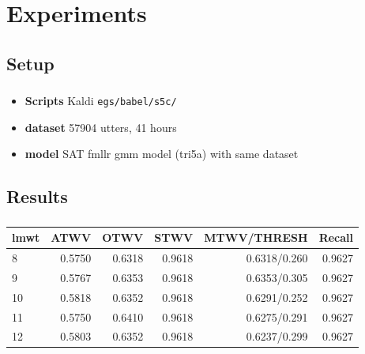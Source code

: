 \documentclass{beamer}
\begin{document}
\section{Experiments}
\subsection{Setup}
\frame
{
  \frametitle{\subsecname}
  
  \begin{itemize}
    \item \textbf{Scripts} Kaldi \texttt{egs/babel/s5c/}
    \item \textbf{dataset} 57904 utters, 41 hours
    \item \textbf{model} SAT fmllr gmm model (tri5a) with same dataset
  \end{itemize}
}

\subsection{Results}
\frame
{
  \frametitle{\subsecname}
  
        \begin{tabular}{l|r|r|r|r|r}
           lmwt              &   ATWV    &    OTWV   &  STWV   &  MTWV/THRESH  &  Recall \\
           \hline
           \hline
           8                     &    0.5750   &    0.6318   &   0.9618 &  0.6318/0.260               & 0.9627 \\
           9                     &    0.5767   &    0.6353   &   0.9618 &  0.6353/0.305               & 0.9627 \\
           10                   &    0.5818   &    0.6352   &   0.9618 &  0.6291/0.252               & 0.9627 \\
           11                   &    0.5750   &    0.6410   &   0.9618 &  0.6275/0.291               & 0.9627 \\
           12                   &    0.5803   &    0.6352   &   0.9618 &  0.6237/0.299               & 0.9627 \\
        \end{tabular}
}
\end{document}
